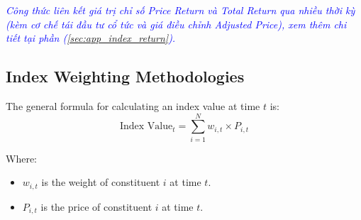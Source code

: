 
\textcolor{blue}{\textit{Công thức liên kết giá trị chỉ số Price Return và Total Return qua nhiều thời kỳ (kèm cơ chế tái đầu tư cổ tức và giá điều chỉnh Adjusted Price), xem thêm chi tiết tại phần (\ref{sec:app_index_return}).}}

\subsection{Index Weighting Methodologies}
	\label{subsec:Index Weighting Methodologies}
The general formula for calculating an index value at time $t$ is:
\begin{equation}
	\text{Index Value}_t = \sum_{i=1}^{N} w_{i,t} \times P_{i,t}
	\label{eq:general_index_value}
\end{equation}

Where:
\begin{itemize}
	\item[] $w_{i,t}$ is the weight of constituent $i$ at time $t$.
	\item[] $P_{i,t}$ is the price of constituent $i$ at time $t$.
\end{itemize}

